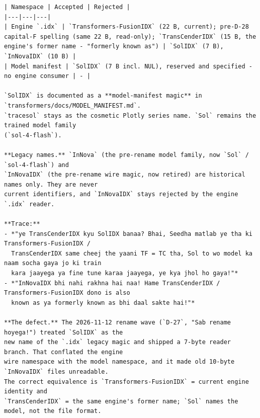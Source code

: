 \begin{verbatim}
| Namespace | Accepted | Rejected |
|---|---|---|
| Engine `.idx` | `Transformers-FusionIDX` (22 B, current); pre-D-28 capital-F spelling (same 22 B, read-only); `TransCenderIDX` (15 B, the engine's former name - "formerly known as") | `SolIDX` (7 B), `InNovaIDX` (10 B) |
| Model manifest | `SolIDX` (7 B incl. NUL), reserved and specified - no engine consumer | - |

`SolIDX` is documented as a **model-manifest magic** in `transformers/docs/MODEL_MANIFEST.md`.
`tracesol` stays as the cosmetic Plotly series name. `Sol` remains the trained model family
(`sol-4-flash`).

**Legacy names.** `InNova` (the pre-rename model family, now `Sol` / `sol-4-flash`) and
`InNovaIDX` (the pre-rename wire magic, now retired) are historical names only. They are never
current identifiers, and `InNovaIDX` stays rejected by the engine `.idx` reader.

**Trace:**
- *"ye TransCenderIDX kyu SolIDX banaa? Bhai, Seedha matlab ye tha ki Transformers-FusionIDX /
  TransCenderIDX same cheej the yaani TF = TC tha, Sol to wo model ka naam socha gaya jo ki train
  kara jaayega ya fine tune karaa jaayega, ye kya jhol ho gaya!"*
- *"InNovaIDX bhi nahi rakhna hai naa! Hame TransCenderIDX / Transformers-FusionIDX dono is also
  known as ya formerly known as bhi daal sakte hai!"*

**The defect.** The 2026-11-12 rename wave (`D-27`, "Sab rename hoyega!") treated `SolIDX` as the
new name of the `.idx` legacy magic and shipped a 7-byte reader branch. That conflated the engine
wire namespace with the model namespace, and it made old 10-byte `InNovaIDX` files unreadable.
The correct equivalence is `Transformers-FusionIDX` = current engine identity and
`TransCenderIDX` = the same engine's former name; `Sol` names the model, not the file format.


\end{verbatim}
